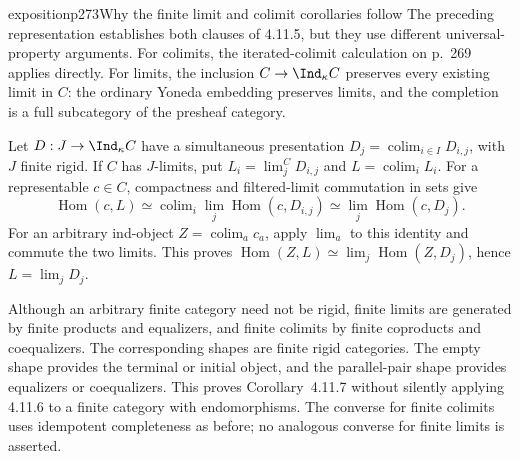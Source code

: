 \begin{dcomment}{exposition}{p273}{Why the finite limit and colimit corollaries follow}
The preceding representation establishes both clauses of 4.11.5, but they use different universal-property arguments. For colimits, the iterated-colimit calculation on p.~269 applies directly. For limits, the inclusion $C\to\Ind_\kappa C$ preserves every existing limit in $C$: the ordinary Yoneda embedding preserves limits, and the completion is a full subcategory of the presheaf category.

Let $D:J\to\Ind_\kappa C$ have a simultaneous presentation $D_j=\operatorname{colim}_{i\in I}D_{i,j}$, with $J$ finite rigid. If $C$ has $J$-limits, put $L_i=\lim_j^C D_{i,j}$ and $L=\operatorname{colim}_i L_i$. For a representable $c\in C$, compactness and filtered-limit commutation in sets give
\[
 \operatorname{Hom}(c,L)
 \simeq\operatorname{colim}_i\lim_j\operatorname{Hom}(c,D_{i,j})
 \simeq\lim_j\operatorname{Hom}(c,D_j).
\]
For an arbitrary ind-object $Z=\operatorname{colim}_a c_a$, apply $\lim_a$ to this identity and commute the two limits. This proves $\operatorname{Hom}(Z,L)\simeq\lim_j\operatorname{Hom}(Z,D_j)$, hence $L=\lim_j D_j$.

Although an arbitrary finite category need not be rigid, finite limits are generated by finite products and equalizers, and finite colimits by finite coproducts and coequalizers. The corresponding shapes are finite rigid categories. The empty shape provides the terminal or initial object, and the parallel-pair shape provides equalizers or coequalizers. This proves Corollary~4.11.7 without silently applying 4.11.6 to a finite category with endomorphisms. The converse for finite colimits uses idempotent completeness as before; no analogous converse for finite limits is asserted.
\end{dcomment}

